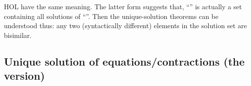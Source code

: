 HOL have the same meaning. The latter form suggests that,
``'' is actually a set containing all
solutions of ``''. Then the unique-solution
theorems can be understood thus: any two (syntactically different) elements
in the solution set are bisimilar.

\subsection{Unique solution of equations/contractions (the \multivariate version)}

